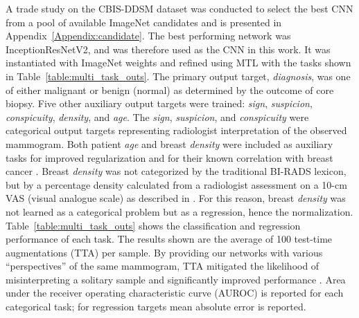\documentclass[journal]{IEEEtran}
\begin{document}
A trade study on the CBIS-DDSM dataset was conducted to select the best CNN from a pool of available ImageNet candidates \cite{ddsm-database1, ddsm-database2} and is presented in Appendix~\ref{Appendix:candidate}.  %
The best performing network was InceptionResNetV2, and was therefore used as the CNN in this work.  It was instantiated with ImageNet weights and refined using MTL with the tasks shown in Table~\ref{table:multi_task_outs}. The primary output target, \textit{diagnosis}, was one of either malignant or benign (normal) as determined by the outcome of core biopsy.    Five other auxiliary output targets were trained: \textit{sign}, \textit{suspicion}, \textit{conspicuity}, \textit{density}, and \textit{age}.  The \textit{sign}, \textit{suspicion}, and \textit{conspicuity} were categorical output targets representing radiologist interpretation of the observed mammogram.  Both patient \textit{age} and breast \textit{density} were included as auxiliary tasks for improved regularization and for their known correlation with breast cancer \cite{age-breastdensity, age-breastdensity2, wu-etal-2017, karssemeijer-1998, kallenberg-2016, mohamed-2018}. 
Breast \textit{density} was not categorized by the traditional BI-RADS lexicon, but by a percentage density calculated  from a radiologist assessment on a 10-cm VAS (visual analogue scale) as described in \cite{tommy-2015}. For this reason, breast \textit{density} was not learned as a categorical problem but as a regression, hence the normalization.  Table~\ref{table:multi_task_outs} shows the classification and regression performance of each task. The results shown are the average of 100 test-time augmentations (TTA) per sample.   By providing our networks with various ``perspectives'' of the same mammogram, TTA mitigated the likelihood of misinterpreting a solitary sample and significantly improved performance \cite{test-time-augmentation, test-time-augmentation2}. Area under the receiver operating characteristic curve (AUROC) is reported for each categorical task; for regression targets mean absolute error is reported.  
\end{document}

